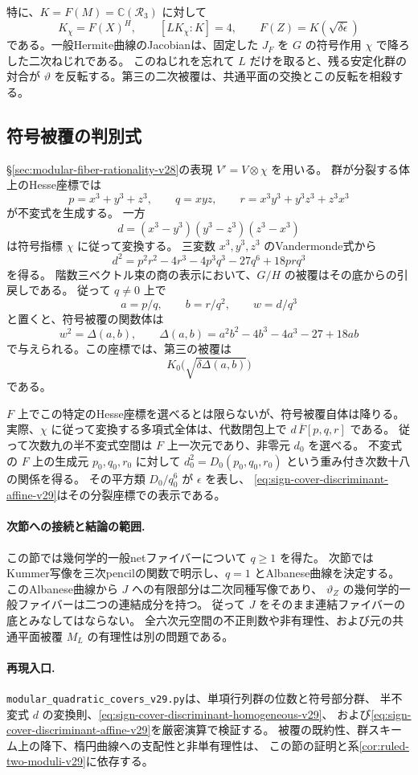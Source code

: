 特に、$K=F(M)=\mathbb C(\mathcal R_3)$ に対して
\[
 K_\chi=F(X)^H,
 \qquad [LK_\chi:K]=4,
 \qquad F(Z)=K(\sqrt{\delta\epsilon})
\]
である。一般Hermite曲線のJacobianは、固定した $J_F$ を
$G$ の符号作用 $\chi$ で降ろした二次ねじれである。
このねじれを忘れて $L$ だけを取ると、残る安定化群の対合が
$\vartheta$ を反転する。第三の二次被覆は、共通平面の交換とこの反転を相殺する。

\subsection{符号被覆の判別式}

\S\ref{sec:modular-fiber-rationality-v28}の表現
$V'=V\otimes\chi$ を用いる。
群が分裂する体上のHesse座標では
\[
 p=x^3+y^3+z^3,\qquad q=xyz,\qquad
 r=x^3y^3+y^3z^3+z^3x^3
\]
が不変式を生成する。
一方
\[
 d=(x^3-y^3)(y^3-z^3)(z^3-x^3)
\]
は符号指標 $\chi$ に従って変換する。
三変数 $x^3,y^3,z^3$ のVandermonde式から
\begin{equation}
 d^2=p^2r^2-4r^3-4p^3q^3-27q^6+18prq^3
 \label{eq:sign-cover-discriminant-homogeneous-v29}
\end{equation}
を得る。
階数三ベクトル束の商の表示において、$G/H$ の被覆はその底からの引戻しである。
従って $q\ne0$ 上で
\[
 a=p/q,\qquad b=r/q^2,\qquad w=d/q^3
\]
と置くと、符号被覆の関数体は
\begin{equation}
 w^2=\Delta(a,b),\qquad
 \Delta(a,b)=a^2b^2-4b^3-4a^3-27+18ab
 \label{eq:sign-cover-discriminant-affine-v29}
\end{equation}
で与えられる。この座標では、第三の被覆は
\[
 K_0\bigl(\sqrt{\delta\Delta(a,b)}\bigr)
\]
である。

$F$ 上でこの特定のHesse座標を選べるとは限らないが、符号被覆自体は降りる。
実際、$\chi$ に従って変換する多項式全体は、代数閉包上で
$d\,\overline F[p,q,r]$ である。
従って次数九の半不変式空間は $F$ 上一次元であり、非零元 $d_0$ を選べる。
不変式の $F$ 上の生成元 $p_0,q_0,r_0$ に対して
$d_0^2=D_0(p_0,q_0,r_0)$ という重み付き次数十八の関係を得る。
その平方類 $D_0/q_0^6$ が $\epsilon$ を表し、
\eqref{eq:sign-cover-discriminant-affine-v29}はその分裂座標での表示である。

\paragraph{次節への接続と結論の範囲.}
この節では幾何学的一般netファイバーについて $q\ge1$ を得た。
次節ではKummer写像を三次pencilの関数で明示し、$q=1$ とAlbanese曲線を決定する。
このAlbanese曲線から $J$ への有限部分は二次同種写像であり、
$\vartheta_Z$ の幾何学的一般ファイバーは二つの連結成分を持つ。
従って $J$ をそのまま連結ファイバーの底とみなしてはならない。
全六次元空間の不正則数や非有理性、および元の共通平面被覆 $M_L$ の有理性は別の問題である。

\paragraph{再現入口.}
\nolinkurl{modular_quadratic_covers_v29.py}は、単項行列群の位数と符号部分群、
半不変式 $d$ の変換則、\eqref{eq:sign-cover-discriminant-homogeneous-v29}、
および\eqref{eq:sign-cover-discriminant-affine-v29}を厳密演算で検証する。
被覆の既約性、群スキーム上の降下、楕円曲線への支配性と非単有理性は、
この節の証明と系\ref{cor:ruled-two-moduli-v29}に依存する。
